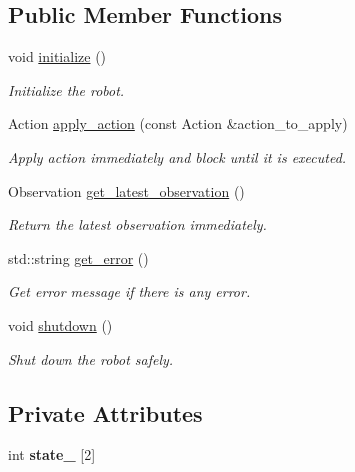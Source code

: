 \subsection*{Public Member Functions}
\begin{DoxyCompactItemize}
\item 
void \hyperlink{classDriver_a81c0beb523fad80cd40cfcc6a6e3de2d}{initialize} ()
\begin{DoxyCompactList}\small\item\em Initialize the robot. \end{DoxyCompactList}\item 
Action \hyperlink{classDriver_a0f8d51bef151ccc38a0cb7b226048e28}{apply\+\_\+action} (const Action \&action\+\_\+to\+\_\+apply)
\begin{DoxyCompactList}\small\item\em Apply action immediately and block until it is executed. \end{DoxyCompactList}\item 
Observation \hyperlink{classDriver_afb09663997bffc5c694fb5aa8aca243a}{get\+\_\+latest\+\_\+observation} ()
\begin{DoxyCompactList}\small\item\em Return the latest observation immediately. \end{DoxyCompactList}\item 
std\+::string \hyperlink{classDriver_a6fb739b87c892c4102e838508855c0be}{get\+\_\+error} ()
\begin{DoxyCompactList}\small\item\em Get error message if there is any error. \end{DoxyCompactList}\item 
void \hyperlink{classDriver_a630fc9183eb419beb09b5828b4547b6d}{shutdown} ()
\begin{DoxyCompactList}\small\item\em Shut down the robot safely. \end{DoxyCompactList}\end{DoxyCompactItemize}
\subsection*{Private Attributes}
\begin{DoxyCompactItemize}
\item 
\mbox{\label{classDriver_acf6c56cd7c260695439a8625fa07aef9}} 
int {\bfseries state\+\_\+} \mbox{[}2\mbox{]}
\end{DoxyCompactItemize}
